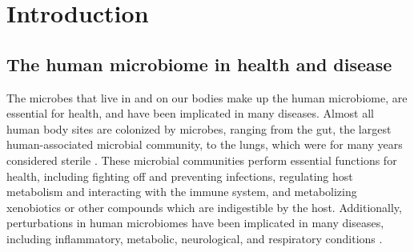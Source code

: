 
\chapter{Introduction}

\section{The human microbiome in health and disease}

The microbes that live in and on our bodies make up the human microbiome, are essential for health, and have been implicated in many diseases.
Almost all human body sites are colonized by microbes, ranging from the gut, the largest human-associated microbial community, to the lungs, which were for many years considered sterile \cite{sender-2016-bhratio,beck-2012-lungmicrobiome}.
These microbial communities perform essential functions for health, including fighting off and preventing infections, regulating host metabolism and interacting with the immune system, and metabolizing xenobiotics or other compounds which are indigestible by the host.
Additionally, perturbations in human microbiomes have been implicated in many diseases, including inflammatory, metabolic, neurological, and respiratory conditions \cite{beck-2012-lungmicrobiome,ibd-papa,ridaura-2013-obfmt,hsiao-2013-autism}.

